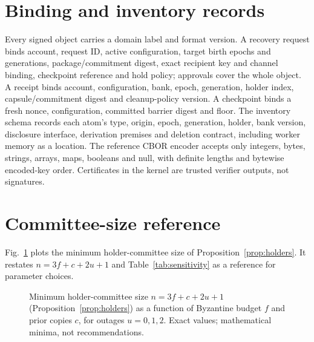 \documentclass[pdflatex,sn-mathphys-num,twocolumn]{sn-jnl}
\theoremstyle{plain}
\theoremstyle{definition}
\begin{document}
\begin{appendices}
\section{Binding and inventory records}\label{app:binding}
Every signed object carries a domain label and format version. A recovery request binds account, request ID, active configuration, target birth epochs and generations, package/commitment digest, exact recipient key and channel binding, checkpoint reference and hold policy; approvals cover the whole object. A receipt binds account, configuration, bank, epoch, generation, holder index, capsule/commitment digest and cleanup-policy version. A checkpoint binds a fresh nonce, configuration, committed barrier digest and floor. The inventory schema records each atom's type, origin, epoch, generation, holder, bank version, disclosure interface, derivation premises and deletion contract, including worker memory as a location. The reference CBOR encoder accepts only integers, bytes, strings, arrays, maps, booleans and null, with definite lengths and bytewise encoded-key order. Certificates in the kernel are trusted verifier outputs, not signatures.

\section{Committee-size reference}\label{app:params}
Fig.~\ref{fig:minholders} plots the minimum holder-committee size of Proposition~\ref{prop:holders}. It restates $n=3f+c+2u+1$ and Table~\ref{tab:sensitivity} as a reference for parameter choices.

\begin{figure}[t]
\centering

\caption{Minimum holder-committee size $n=3f+c+2u+1$ (Proposition~\ref{prop:holders}) as a function of Byzantine budget $f$ and prior copies $c$, for outages $u=0,1,2$. Exact values; mathematical minima, not recommendations.}\label{fig:minholders}
\end{figure}
\end{appendices}


\end{document}

